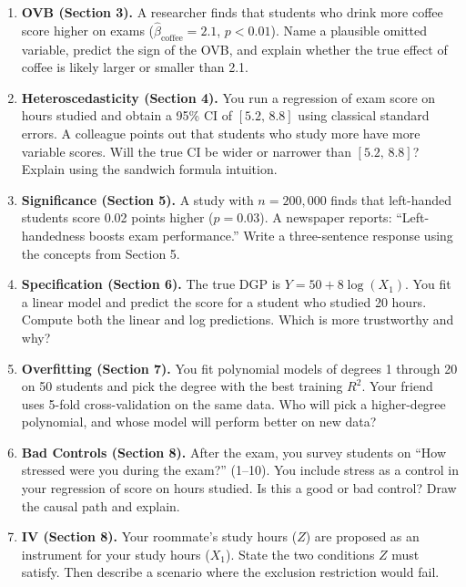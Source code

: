 \documentclass[11pt,a4paper]{article}
\theoremstyle{definition}
\theoremstyle{plain}
\theoremstyle{remark}
\newcommand{\bhat}{\hat{\beta}}
\begin{document}
\begin{enumerate}

\item \textbf{OVB (Section 3).}
A researcher finds that students who drink more coffee score higher on exams ($\bhat_{\text{coffee}} = 2.1$, $p < 0.01$). Name a plausible omitted variable, predict the sign of the OVB, and explain whether the true effect of coffee is likely larger or smaller than 2.1.

\item \textbf{Heteroscedasticity (Section 4).}
You run a regression of exam score on hours studied and obtain a 95\% CI of $[5.2,\, 8.8]$ using classical standard errors. A colleague points out that students who study more have more variable scores. Will the true CI be wider or narrower than $[5.2,\, 8.8]$? Explain using the sandwich formula intuition.

\item \textbf{Significance (Section 5).}
A study with $n = 200{,}000$ finds that left-handed students score 0.02 points higher ($p = 0.03$). A newspaper reports: ``Left-handedness boosts exam performance.'' Write a three-sentence response using the concepts from Section 5.

\item \textbf{Specification (Section 6).}
The true DGP is $Y = 50 + 8\log(X_1)$. You fit a linear model and predict the score for a student who studied 20 hours. Compute both the linear and log predictions. Which is more trustworthy and why?

\item \textbf{Overfitting (Section 7).}
You fit polynomial models of degrees 1 through 20 on 50 students and pick the degree with the best training $R^2$. Your friend uses 5-fold cross-validation on the same data. Who will pick a higher-degree polynomial, and whose model will perform better on new data?

\item \textbf{Bad Controls (Section 8).}
After the exam, you survey students on ``How stressed were you during the exam?'' (1--10). You include stress as a control in your regression of score on hours studied. Is this a good or bad control? Draw the causal path and explain.

\item \textbf{IV (Section 8).}
Your roommate's study hours ($Z$) are proposed as an instrument for your study hours ($X_1$). State the two conditions $Z$ must satisfy. Then describe a scenario where the exclusion restriction would fail.


\end{enumerate}
\end{document}
